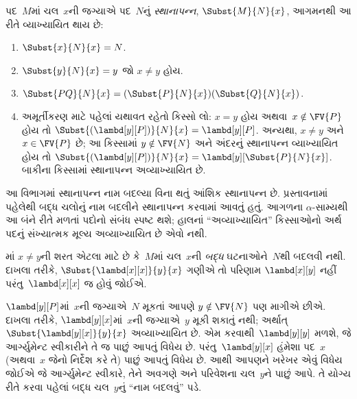 \begin{defn}[સ્થાનાપન્ન] 
  પદ~$M$માં ચલ~$x$ની જગ્યાએ પદ~$N$નું \emph{સ્થાનાપન્ન},
  $\Subst{M}{N}{x}$, આગમનથી આ રીતે વ્યાખ્યાયિત થાય છે:
  \begin{enumerate}
    \item $\Subst{x}{N}{x} = N$. 
    \item $\Subst{y}{N}{x}  = y$ જો $x \neq y$ હોય.
    \item $\Subst{PQ}{N}{x}  = (\Subst{P}{N}{x}) (\Subst{Q}{N}{x})$.
    \item અમૂર્તીકરણ માટે પહેલાં યથાવત રહેતો કિસ્સો લો:
      $x=y$ હોય અથવા~$x\notin\FV{P}$ હોય તો
      $\Subst{(\lambd[y][P])}{N}{x}=\lambd[y][P]$.
      અન્યથા, $x\neq y$ અને~$x\in\FV{P}$ છે; આ કિસ્સામાં
      $y\notin\FV{N}$ અને અંદરનું સ્થાનાપન્ન વ્યાખ્યાયિત હોય તો
      $\Subst{(\lambd[y][P])}{N}{x}=\lambd[y][\Subst{P}{N}{x}]$.
      બાકીના કિસ્સામાં સ્થાનાપન્ન અવ્યાખ્યાયિત છે.
  \end{enumerate}
\end{defn}
આ વિભાગમાં સ્થાનાપન્ન નામ બદલ્યા વિના થતું આંશિક સ્થાનાપન્ન છે.
પ્રસ્તાવનામાં પહેલેથી બદ્ધ ચલોનું નામ બદલીને સ્થાનાપન્ન કરવામાં
આવતું હતું. આગળના $\alpha$-સામ્યથી આ બંને રીતે મળતાં પદોનો
સંબંધ સ્પષ્ટ થશે; હાલનાં “અવ્યાખ્યાયિત” કિસ્સાઓનો અર્થ
પદનું સંખ્યાત્મક મૂલ્ય અવ્યાખ્યાયિત છે એવો નથી.

\begin{explain}
માં
$x \neq y$ની શરત એટલા માટે છે કે~$M$માં ચલ~$x$ની
\emph{બદ્ધ} ઘટનાઓને~$N$થી બદલવી નથી. દાખલા તરીકે,
$\Subst{\lambd[x][x]}{y}{x}$ ગણીએ તો પરિણામ
$\lambd[x][y]$ નહીં પરંતુ~$\lambd[x][x]$ જ હોવું જોઈએ.

$\lambd[y][P]$માં~$x$ની જગ્યાએ~$N$ મૂકતાં આપણે
$y \notin \FV{N}$ પણ માગીએ છીએ. દાખલા તરીકે,
$\lambd[y][x]$માં~$x$ની જગ્યાએ~$y$ મૂકી શકાતું નથી;
અર્થાત્~$\Subst{\lambd[y][x]}{y}{x}$ અવ્યાખ્યાયિત છે.
એમ કરવાથી~$\lambd[y][y]$ મળશે, જે આર્ગ્યુમેન્ટ સ્વીકારીને
તે જ પાછું આપતું વિધેય છે. પરંતુ~$\lambd[y][x]$ હંમેશા
પદ~$x$ (અથવા~$x$ જેનો નિર્દેશ કરે તે) પાછું આપતું વિધેય છે.
આથી આપણને ખરેખર એવું વિધેય જોઈએ જે આર્ગ્યુમેન્ટ સ્વીકારે,
તેને અવગણે અને પરિવેશના ચલ~$y$ને પાછું આપે. તે યોગ્ય રીતે
કરવા પહેલાં બદ્ધ ચલ~$y$નું ``નામ બદલવું'' પડે.
\end{explain}

